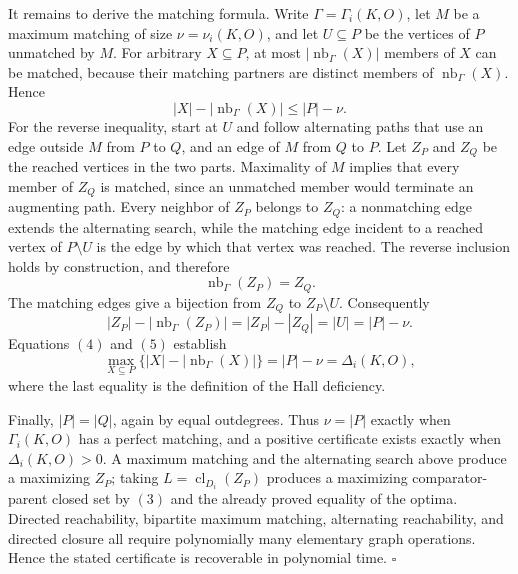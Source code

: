 It remains to derive the matching formula.  Write \(\Gamma=\Gamma_i(K,O)\), let \(M\) be a maximum matching of size \(\nu=\nu_i(K,O)\), and let \(U\subseteq P\) be the vertices of \(P\) unmatched by \(M\).  For arbitrary \(X\subseteq P\), at most \(|\operatorname{nb}_\Gamma(X)|\) members of \(X\) can be matched, because their matching partners are distinct members of \(\operatorname{nb}_\Gamma(X)\).  Hence
\[
 |X|-|\operatorname{nb}_\Gamma(X)|
 \le |P|-\nu.
 \tag{4}
\]
For the reverse inequality, start at \(U\) and follow alternating paths that use an edge outside \(M\) from \(P\) to \(Q\), and an edge of \(M\) from \(Q\) to \(P\).  Let \(Z_P\) and \(Z_Q\) be the reached vertices in the two parts.  Maximality of \(M\) implies that every member of \(Z_Q\) is matched, since an unmatched member would terminate an augmenting path.  Every neighbor of \(Z_P\) belongs to \(Z_Q\): a nonmatching edge extends the alternating search, while the matching edge incident to a reached vertex of \(P\setminus U\) is the edge by which that vertex was reached.  The reverse inclusion holds by construction, and therefore
\[
 \operatorname{nb}_\Gamma(Z_P)=Z_Q.
\]
The matching edges give a bijection from \(Z_Q\) to \(Z_P\setminus U\).  Consequently
\[
 |Z_P|-|\operatorname{nb}_\Gamma(Z_P)|
 =|Z_P|-|Z_Q|=|U|=|P|-\nu.
 \tag{5}
\]
Equations \((4)\) and \((5)\) establish
\[
 \max_{X\subseteq P}\bigl\{|X|-|\operatorname{nb}_\Gamma(X)|\bigr\}
 =|P|-\nu=\Delta_i(K,O),
\]
where the last equality is the definition of the Hall deficiency.

Finally, \(|P|=|Q|\), again by equal outdegrees.  Thus \(\nu=|P|\) exactly when \(\Gamma_i(K,O)\) has a perfect matching, and a positive certificate exists exactly when \(\Delta_i(K,O)>0\).  A maximum matching and the alternating search above produce a maximizing \(Z_P\); taking \(L=\operatorname{cl}_{D_i}(Z_P)\) produces a maximizing comparator-parent closed set by \((3)\) and the already proved equality of the optima.  Directed reachability, bipartite maximum matching, alternating reachability, and directed closure all require polynomially many elementary graph operations.  Hence the stated certificate is recoverable in polynomial time. \(\square\)

